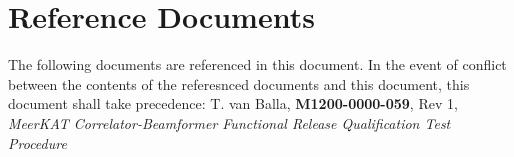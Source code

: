 \section{Reference Documents}
The following documents are referenced in this document. In the event of conflict between the contents of the referesnced documents and this document, this document shall take precedence:\newline\newline
[2]\hspace{10mm} T. van Balla, {\bf M1200-0000-059}, Rev 1, {\it MeerKAT Correlator-Beamformer Functional Release Qualification Test Procedure}\newline

